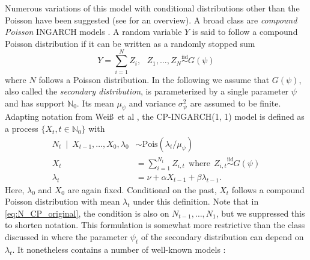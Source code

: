 \documentclass{article}
\begin{document}
Numerous variations of this model with conditional distributions other than the Poisson have been suggested (see \cite{Weiss2018} for an overview). A broad class are \textit{compound Poisson} INGARCH models \cite{Goncalves2015, Silva2016}. A random variable $Y$ is said to follow a compound Poisson distribution \cite[Chapter 3]{Feller1968} if it can be written as a randomly stopped sum 
$$
Y = \sum_{i = 1}^N Z_i, \ \ \ Z_1, \dots, Z_N \stackrel{\text{iid}}{\sim} G(\psi)
$$
where $N$ follows a Poisson distribution. In the following we assume that $G(\psi)$, also called the \textit{secondary distribution}, is parameterized by a single parameter $\psi$ and has support $\mathbb{N}_0$. Its mean $\mu_\psi$ and variance $\sigma^2_\psi$ are assumed to be finite. Adapting notation from Wei\ss\ et al \cite[Sec. 2]{Weiss2017}, the CP-INGARCH(1, 1) model is defined as a process $\{X_t, t \in \mathbb{N}_0\}$ with %
\begin{align}
N_t \ \mid \ X_{t - 1}, \dots, X_0, \lambda_0 & \sim \text{Pois}(\lambda_t/\mu_\psi) \label{eq:N_CP_original}\\
X_t & = \sum_{i = 1}^{N_t} Z_{i, t} \ \ \text{where} \ \  Z_{i, t} \stackrel{\text{iid}}{\sim} G(\psi)\label{eq:X_CP_original}\\
\lambda_t & = \nu + \alpha X_{t - 1} + \beta \lambda_{t - 1}.\label{eq:lambda_CP_original}
\end{align}
Here, $\lambda_0$ and $X_0$ are again fixed. Conditional on the past, $X_t$ follows a compound Poisson distribution with mean $\lambda_t$ under this definition. Note that in \eqref{eq:N_CP_original}, the condition is also on $N_{t - 1}, \dots, N_1$, but we suppressed this to shorten notation. This formulation is somewhat more restrictive than the class discussed in \citep{Goncalves2015} where the parameter $\psi_t$ of the secondary distribution can depend on $\lambda_t$. It nonetheless contains a number of well-known models \cite[Observation 2]{Goncalves2015}:
\end{document}
